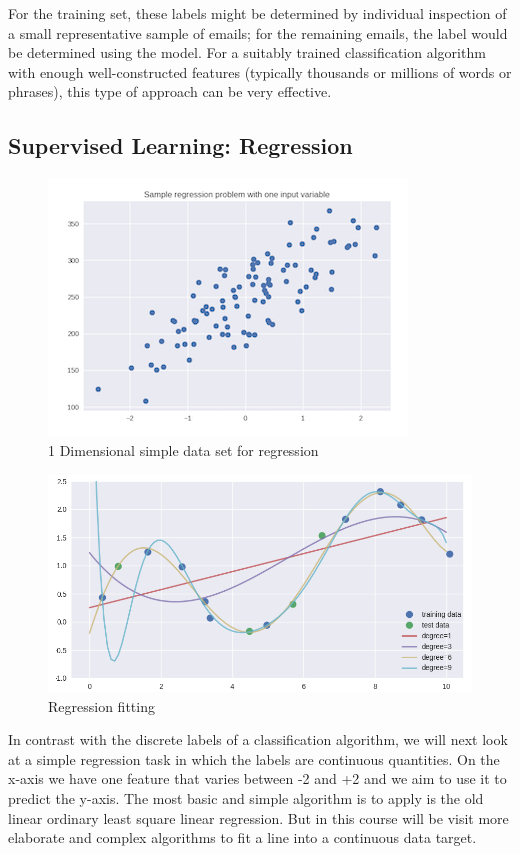 \documentclass{tufte-handout}
\begin{document}
For the training set, these labels might be determined by individual inspection of a small representative sample of emails; for the remaining emails, the label would be determined using the model. For a suitably trained classification algorithm with enough well-constructed features (typically thousands or millions of words or phrases), this type of approach can be very effective. 

\subsection{Supervised Learning: Regression}

\begin{figure}[h]%
  \includegraphics[width=\linewidth]{regression.png}
  \caption{1 Dimensional simple data set for regression}
  \label{fig:syllabus}
\end{figure}
\begin{figure}[h]%
  \includegraphics[width=\linewidth]{regression_1.png}
  \caption{Regression fitting}
  \label{fig:syllabus}
\end{figure}
In contrast with the discrete labels of a classification algorithm, we will next look at a simple regression task in which the labels are continuous quantities. On the x-axis we have one feature that varies between -2 and +2 and we aim to use it to predict the y-axis. The most basic and simple algorithm is to apply is the old linear ordinary least square  linear regression. But in this course will be visit more elaborate and complex algorithms to fit a line into a continuous data target.
\end{document}
